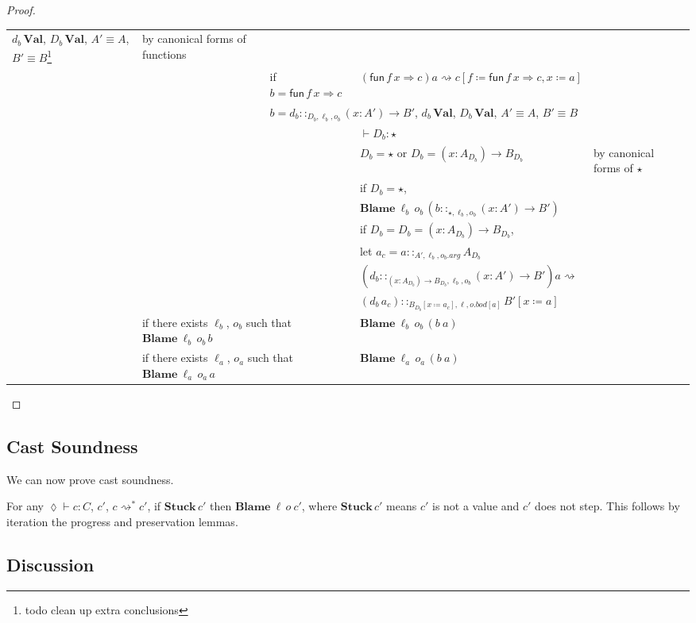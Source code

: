 \begin{proof}
\begin{tabular}{lllll}
{$d_{b}\,\textbf{Val}$, $D_{b}\,\textbf{Val}$, $A'\equiv A$, $B'\equiv B$\footnote{todo clean up extra conclusions}} & by canonical forms of functions\tabularnewline
 &  & if $b=\mathsf{fun}\,f\,x\Rightarrow c$ & $\left(\mathsf{fun}\,f\,x\Rightarrow c\right)a\rightsquigarrow c\left[f\coloneqq\mathsf{fun}\,f\,x\Rightarrow c,x\coloneqq a\right]$ & \tabularnewline
 &  & \multicolumn{2}{l}{$b=d_{b}::_{D_{b},\ell _{b},o_{b}}\left(x:A'\right)\rightarrow B'$,
$d_{b}\,\textbf{Val}$, $D_{b}\,\textbf{Val}$, $A'\equiv A$, $B'\equiv B$} & \tabularnewline
 &  &  & $\vdash D_{b}:\star$ & \tabularnewline
 &  &  & $D_{b}=\star$ or $D_{b}=\left(x:A_{D_{b}}\right)\rightarrow B_{D_{b}}$ & by canonical forms of $\star$\tabularnewline
 &  &  & if $D_{b}=\star$,  & \tabularnewline
 &  &  & $\textbf{Blame}\:\ell _{b}\,o_{b}\,\left(b::_{\star,\ell _{b},o_{b}}\left(x:A'\right)\rightarrow B'\right)$ & \tabularnewline
 &  &  & if $D_{b}=D_{b}=\left(x:A_{D_{b}}\right)\rightarrow B_{D_{b}}$, & \tabularnewline
 &  &  & let $a_{c}=a::_{A',\ell _{b},o_{b}.arg}A_{D_{b}}$ & \tabularnewline
 &  &  & $\left(d_{b}::_{\left(x:A_{D_{b}}\right)\rightarrow B_{D_{b}},\ell _{b},o_{b}}\left(x:A'\right)\rightarrow B'\right)a\rightsquigarrow$ & \tabularnewline
 &  &  & $\left(d_{b}\,a_{c}\right)::_{B_{D_{b}}\left[x\coloneqq a_{c}\right],\ell ,o.bod[a]}B'\left[x\coloneqq a\right]$ & \tabularnewline
 & \multicolumn{2}{l}{if there exists $\ell_{b}$, $o_{b}$ such that $\textbf{Blame}\:\ell _{b}\,o_{b}\,b$} & $\textbf{Blame}\:\ell _{b}\,o_{b}\,\left(b\ a\right)$ & \tabularnewline
 & \multicolumn{2}{l}{if there exists $\ell_{a}$, $o_{a}$ such that $\textbf{Blame}\:\ell _{a}\,o_{a}\,a$} & $\textbf{Blame}\:\ell _{a}\,o_{a}\,\left(b\ a\right)$ & \tabularnewline
\end{tabular}
\end{proof}

\subsection{Cast Soundness}


We can now prove cast soundness.

For any $\lozenge\vdash c:C$, $c'$, $c\rightsquigarrow^{*}c'$, if $\textbf{Stuck}\,c'$ then $\textbf{Blame}\:\ell \,o\:c'$, where $\textbf{Stuck}\,c'$ means $c'$ is not a value and $c'$ does not step.
This follows by iteration the progress and preservation lemmas.

\subsection{Discussion}

